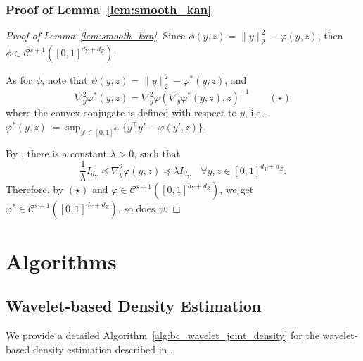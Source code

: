 \documentclass{article}
\theoremstyle{plain}
\theoremstyle{definition}
\def\calC{\mathcal{C}}
\theoremstyle{plain}
\def\calC{\mathcal{C}}
\begin{document}
\subsubsection{Proof of Lemma~\ref{lem:smooth_kan}}
\begin{proof}[Proof of Lemma~\ref{lem:smooth_kan}]
    Since $\phi(y, z) = \|y\|_2^2 - \varphi(y, z)$, then $\phi \in \calC^{s+1}([0,1]^{d_Y+d_Z})$. 
    
    As for $\psi$, note that $\psi(y, z) = \|y\|_2^2 - \varphi^*(y, z)$, and
    \[
        \nabla^2_y \varphi^*(y, z) = \nabla^2_y \varphi( \nabla_y \varphi^{*}(y,z), z)^{-1} \qquad (\star)
    \]
    where the convex conjugate is defined with respect to $y$, i.e., $\varphi^*(y,z) := \sup_{y' \in [0,1]^{d_Y}} \{y^\top y' - \varphi(y', z)\}$.

    By , there is a constant $\lambda > 0$, such that
    \[
        \frac{1}{\lambda} I_{d_Y} \preceq \nabla^2_y \varphi(y,z) \preceq \lambda I_{d_Y}\quad \forall y, z \in [0,1]^{d_Y + d_Z}.
    \]
    Therefore, by $(\star)$ and $\varphi \in \calC^{s+1}([0,1]^{d_Y+d_Z})$, we get $\varphi^* \in \calC^{s+1}([0,1]^{d_Y+d_Z})$, so does $\psi$.
\end{proof}



\section{Algorithms}\label{appe:sec:algorithms}


\subsection{Wavelet-based Density Estimation}\label{sec:optimal.transport.estimated.density}

We provide a detailed Algorithm~\ref{alg:bc_wavelet_joint_density} for the wavelet-based density estimation
described in .
\end{document}
